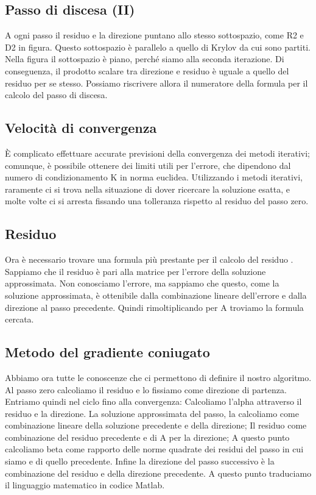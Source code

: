 \documentclass[a4paper]{article}
\begin{document}
\subsection*{Passo di discesa (II)}
A ogni passo il residuo e la direzione puntano allo stesso sottospazio, come R2 e D2 in figura.
Questo sottospazio è parallelo a quello di Krylov da cui sono partiti. Nella figura il sottospazio è piano, perché siamo alla seconda iterazione.
Di conseguenza, il prodotto scalare tra direzione e residuo è uguale a quello del residuo per se stesso.
Possiamo riscrivere allora il numeratore della formula per il calcolo del passo di discesa.

\subsection*{Velocità di convergenza}
È complicato effettuare accurate previsioni della convergenza dei metodi iterativi; comunque, è possibile ottenere dei limiti utili per l’errore, che dipendono dal numero di condizionamento K in norma euclidea.
Utilizzando i metodi iterativi, raramente ci si trova nella situazione di dover ricercare la soluzione esatta, e molte volte ci si arresta fissando una tolleranza rispetto al residuo del passo zero.

\subsection*{Residuo}
Ora è necessario trovare una formula più prestante per il calcolo del residuo .
Sappiamo che il residuo è pari alla matrice per l’errore della soluzione approssimata.
Non conosciamo l’errore, ma sappiamo che questo, come la soluzione approssimata, è ottenibile dalla combinazione lineare dell’errore e dalla direzione al passo precedente.
Quindi rimoltiplicando per A troviamo la formula cercata.

\subsection*{Metodo del gradiente coniugato}
Abbiamo ora tutte le conoscenze che ci permettono di definire il nostro algoritmo.
Al passo zero calcoliamo il residuo e lo fissiamo come direzione di partenza.
Entriamo quindi nel ciclo fino alla convergenza:
Calcoliamo l’alpha attraverso il residuo e la direzione.
La soluzione approssimata del passo, la calcoliamo come combinazione lineare della soluzione precedente e della direzione;
Il residuo come combinazione del residuo precedente e di A per la direzione;
A questo punto calcoliamo beta come rapporto delle norme quadrate dei residui del passo in cui siamo e di quello precedente.
Infine la direzione del passo successivo  è la combinazione del residuo e della direzione precedente.
A questo punto traduciamo il linguaggio matematico in codice Matlab.
\end{document}
